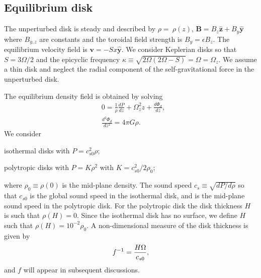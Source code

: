 
\subsection{Equilibrium disk} 
The unperturbed disk is steady and described by
$\rho=~\rho(z)$, $\bm{B} = B_z\hat{\bm{z}} + B_y\hat{\bm{y}}$ where
$B_{y,z}$ are constants and the toroidal field strength is
$B_y=\epsilon B_z$. The equilibrium 
velocity field is $\bm{v} = -Sx\hat{\bm{y}}$. We consider Keplerian
disks so that $S = 3\Omega/2$ and the epicyclic frequency 
$\kappa\equiv\sqrt{2\Omega(2\Omega-S)}=\Omega=\Omega_z$. 
We assume a thin disk and neglect the radial component of the
self-gravitational force in 
the unperturbed disk.    

The equilibrium density field is obtained by solving
\begin{align}
  &0=\frac{1}{\rho}\frac{d P}{dz} + \Omega_z^2z + \frac{d\Phi_d}{dz},\label{eqm_eqns1}\\
  &\frac{d^2\Phi_d}{dz^2} = 4\pi G \rho.\label{eqm_eqns2}
\end{align}
We consider \begin{inparaenum}[(i)]
\item isothermal disks with $P=c_{s0}^2\rho$\label{iso_eos}; 
\item polytropic disks with $P=K\rho^2$ with $K=c_{s0}^2/2\rho_0$;
\end{inparaenum}
where $\rho_0\equiv\rho(0)$ is the mid-plane density.
The sound speed $c_s\equiv\sqrt{dP/d\rho}$ 
so that $c_{s0}$ is the global sound speed in the isothermal disk, and
is the mid-plane sound speed in the polytropic disk. For the polytropic
disk the disk thickness $H$ is such that $\rho(H)=0$. Since the
isothermal disk has no surface, we define $H$ such that
$\rho(H)=10^{-2}\rho_0$. A non-dimensional
measure of the disk thickness is given by 
\begin{align}
  f^{-1} = \frac{H\Omega}{c_{s0}}, 
\end{align}
and $f$ will appear in subsequent discussions. 


